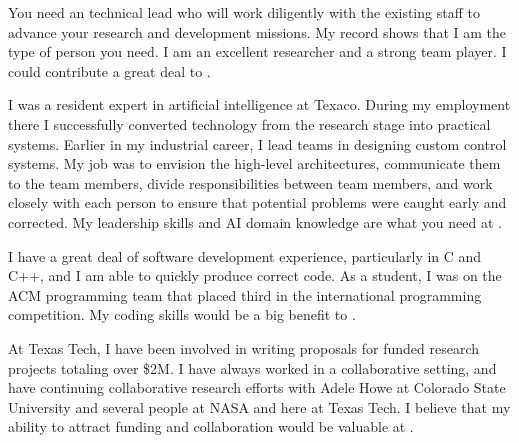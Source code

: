 

You need an technical lead who will work diligently with the existing staff
to advance your research and development missions.  My record shows that I
am the type of person you need.  I am an excellent researcher and a strong
team player.  I could contribute a great deal to \place.

I was a resident expert in artificial intelligence at Texaco.  During
my employment there I successfully converted technology from the 
research stage into practical systems.  Earlier in my industrial 
career, I lead teams in designing custom control systems.  My job
was to envision the high-level architectures, communicate them
to the team members, divide responsibilities between team members,
and work closely with each person to ensure that potential problems
were caught early and corrected.  My leadership skills and AI 
domain knowledge are what you need at \place.

I have a great deal of software development experience, particularly in C
and C++, and  I am able to quickly produce correct code.
As a student, I was on the ACM programming team that placed third in the
international programming competition.  
My coding skills would be a big benefit to \place.

At Texas Tech, I have been involved in writing proposals for funded research
projects totaling over \$2M.  I have always worked in a collaborative
setting, and have continuing collaborative research efforts with Adele Howe
at Colorado State University and several people at NASA and here at Texas
Tech.  I believe that my ability to attract funding and collaboration would
be valuable at \place.


